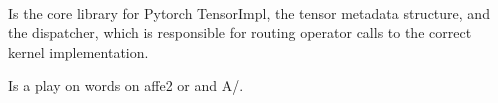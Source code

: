 \begin{defnbox}\nospacing
    \begin{defn}[C10]\label{defn:c10}\leavevmode\\
        Is the core library for Pytorch
        TensorImpl, the tensor metadata structure, and the dispatcher, which is responsible for routing operator calls to the correct kernel implementation.
    \end{defn}
\end{defnbox}
\begin{notebox}\nospacing
   Is a play on words on affe2 or  and A/.
\end{notebox}


